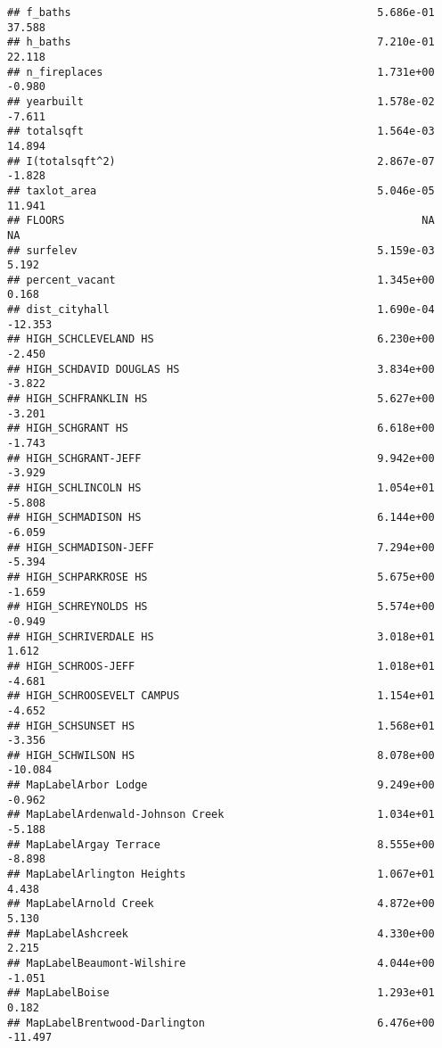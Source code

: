 \documentclass[]{article}
\begin{document}
\begin{verbatim}
## f_baths                                                5.686e-01  37.588
## h_baths                                                7.210e-01  22.118
## n_fireplaces                                           1.731e+00  -0.980
## yearbuilt                                              1.578e-02  -7.611
## totalsqft                                              1.564e-03  14.894
## I(totalsqft^2)                                         2.867e-07  -1.828
## taxlot_area                                            5.046e-05  11.941
## FLOORS                                                        NA      NA
## surfelev                                               5.159e-03   5.192
## percent_vacant                                         1.345e+00   0.168
## dist_cityhall                                          1.690e-04 -12.353
## HIGH_SCHCLEVELAND HS                                   6.230e+00  -2.450
## HIGH_SCHDAVID DOUGLAS HS                               3.834e+00  -3.822
## HIGH_SCHFRANKLIN HS                                    5.627e+00  -3.201
## HIGH_SCHGRANT HS                                       6.618e+00  -1.743
## HIGH_SCHGRANT-JEFF                                     9.942e+00  -3.929
## HIGH_SCHLINCOLN HS                                     1.054e+01  -5.808
## HIGH_SCHMADISON HS                                     6.144e+00  -6.059
## HIGH_SCHMADISON-JEFF                                   7.294e+00  -5.394
## HIGH_SCHPARKROSE HS                                    5.675e+00  -1.659
## HIGH_SCHREYNOLDS HS                                    5.574e+00  -0.949
## HIGH_SCHRIVERDALE HS                                   3.018e+01   1.612
## HIGH_SCHROOS-JEFF                                      1.018e+01  -4.681
## HIGH_SCHROOSEVELT CAMPUS                               1.154e+01  -4.652
## HIGH_SCHSUNSET HS                                      1.568e+01  -3.356
## HIGH_SCHWILSON HS                                      8.078e+00 -10.084
## MapLabelArbor Lodge                                    9.249e+00  -0.962
## MapLabelArdenwald-Johnson Creek                        1.034e+01  -5.188
## MapLabelArgay Terrace                                  8.555e+00  -8.898
## MapLabelArlington Heights                              1.067e+01   4.438
## MapLabelArnold Creek                                   4.872e+00   5.130
## MapLabelAshcreek                                       4.330e+00   2.215
## MapLabelBeaumont-Wilshire                              4.044e+00  -1.051
## MapLabelBoise                                          1.293e+01   0.182
## MapLabelBrentwood-Darlington                           6.476e+00 -11.497

\end{verbatim}
\end{document}
